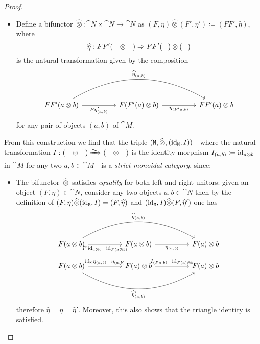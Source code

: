 \documentclass[../../deep-dive]{subfiles}
\begin{document}
\begin{proof}
\begin{itemize}
        \item Define a bifunctor \(\widehat\otimes: \cat N \times \cat N \to \cat N\) as
              \((F, \eta) \widehat\otimes (F', \eta') \coloneq (F F', \widehat\eta)\), where
              \[
                  \widehat\eta: F F'(- \otimes -) \Rightarrow F F'(-) \otimes (-)
              \]
              is the natural transformation given by the composition
              \[
                  \begin{tikzcd}
                      F F'(a \otimes b)
                      \ar[rr, "F \eta'_{(a, b)}"']
                      \ar[rrrr, bend left, "\widehat\eta_{(a, b)}"]
                      &
                      &F (F'(a) \otimes b)
                      \ar[rr, "\eta_{(F' a, b)}"']
                      &
                      &F F'(a) \otimes b
                  \end{tikzcd}
              \]
              for any pair of objects \((a, b)\) of \(\cat M\).
    \end{itemize}
    From this construction we find that the triple
    \((\texttt N, \widehat\otimes, (\operatorname{id}_{\texttt M}, I))\)---where the natural
    transformation \(I: (- \otimes -) \isonat (- \otimes -)\) is the identity
    morphism \(I_{(a, b)} \coloneq \operatorname{id}_{a \otimes b}\) in \(\cat M\) for any two
    \(a, b \in \cat M\)---is a \emph{strict monoidal category}, since:
    \begin{itemize}\setlength\itemsep{0em}
        \item The bifunctor \(\widehat\otimes\) satisfies \emph{equality} for both left
              and right unitors: given an object \((F, \eta) \in \cat N\), consider any two
              objects \(a, b \in \cat N\) then by the definition of \((F, \eta)
              \widehat\otimes (\operatorname{id}_{\texttt M}, I) = (F, \widehat\eta)\) and \((\operatorname{id}_{\texttt M},
              I) \widehat\otimes (F, \widehat\eta')\) one has
              \[
                  \begin{tikzcd}
                      {F(a \otimes b)} \ar[rr, "F \Id_{a \otimes b} = \Id_{F(a \otimes b)}"']
                      \ar[rrrr, bend left, "\widehat\eta_{(a, b)}"]
                      &&{F(a \otimes b)} \ar[rr, "\eta_{(a, b)}"']
                      &&{F(a) \otimes b}
                  \end{tikzcd}
              \]
              \[
                  \begin{tikzcd}
                      {F(a \otimes b)} \ar[rr, "\Id_{\cat M} \eta_{(a, b)} = \eta_{(a, b)}"]
                      \ar[rrrr, bend right, "\widehat\eta'_{(a, b)}"']
                      &&{F(a) \otimes b} \ar[rr, "I_{(Fa, b)} = \Id_{F(a) \otimes b}"]
                      &&{F(a) \otimes b}
                  \end{tikzcd}
              \]
              therefore \(\widehat\eta = \eta = \widehat\eta'\). Moreover, this also shows
              that the triangle identity is satisfied.


\end{itemize}
\end{proof}
\end{document}
